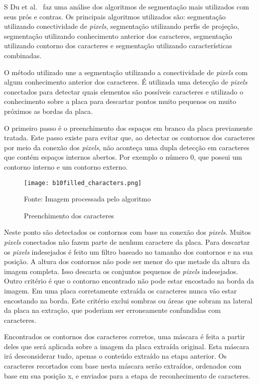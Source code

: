 S Du et al.~\cite{s2013automatic} faz uma análise dos algoritmos de segmentação mais
utilizados com seus prós e contras.  Os principais algoritmos utilizados são:
segmentação utilizando conectividade de \emph{pixels}, segmentação utilizando
perfis de projeção, segmentação utilizando conhecimento anterior dos caracteres,
segmentação utilizando contorno dos caracteres e segmentação utilizando
características combinadas.

O método utilizado une a segmentação utilizando a conectividade de \emph{pixels} com algum conhecimento anterior dos caracteres. É utilizada uma detecção de \emph{pixels} conectados para detectar quais elementos são possíveis caracteres e utilizado o conhecimento sobre a placa para descartar pontos muito pequenos ou muito próximos as bordas da placa.

O primeiro passo é o preenchimento dos espaços em branco da placa previamente tratada. Este passo existe para evitar que, ao detectar os contornos dos caracteres por meio da conexão dos \emph{pixels}, não aconteça uma dupla detecção em caracteres que contém espaços internos abertos. Por exemplo o número 0, que possui um contorno interno e um contorno externo.

\begin{figure}[H]
	\centering
	\texttt{[image: b10filled\_characters.png]}
	\caption{Preenchimento dos caracteres}
Fonte: Imagem processada pelo algoritmo
	\label{fig:preenchimento}
\end{figure}

Neste ponto são detectados os contornos com base na conexão dos \emph{pixels}. Muitos \emph{pixels} conectados não fazem parte de nenhum caractere da placa. Para descartar os \emph{pixels} indesejados é feito um filtro baseado no tamanho dos contornos e na sua posição. A altura dos contornos não pode ser menor do que metade da altura da imagem completa. Isso descarta os conjuntos pequenos de \emph{pixels} indesejados. Outro critério é que o contorno encontrado não pode estar encostado na borda da imagem. Em uma placa corretamente extraída os caracteres nunca vão estar encostando na borda. Este critério exclui sombras ou áreas que sobram na lateral da placa na extração, que poderiam ser erroneamente confundidas com caracteres.

Encontrados os contornos dos caracteres corretos, uma máscara é feita a partir deles que será aplicada sobre a imagem da placa extraída original. Esta máscara irá desconsiderar tudo, apenas o conteúdo extraído na etapa anterior. Os caracteres recortados com base nesta máscara serão extraídos, ordenados com base em sua posição x, e enviados para a etapa de reconhecimento de caracteres.

